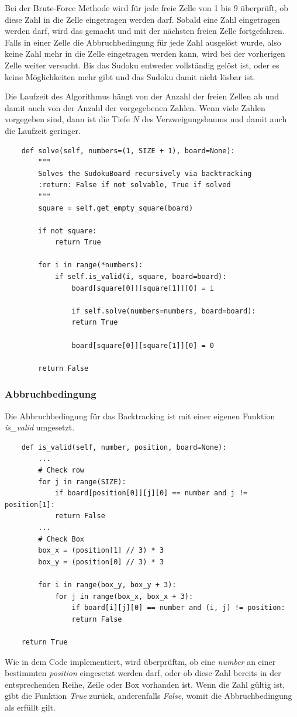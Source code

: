 Bei der Brute-Force Methode wird für jede freie Zelle von 1 bis 9 überprüft, ob diese Zahl in die Zelle eingetragen werden darf. Sobald eine Zahl eingetragen werden darf, wird das gemacht und mit der nächsten freien Zelle fortgefahren. Falls in einer Zelle die Abbruchbedingung für jede Zahl ausgelöst wurde, also keine Zahl mehr in die Zelle eingetragen werden kann, wird bei der vorherigen Zelle weiter versucht. Bis das Sudoku entweder vollständig gelöst ist, oder es keine Möglichkeiten mehr gibt und das Sudoku damit nicht lösbar ist.

Die Laufzeit des Algorithmus hängt von der Anzahl der freien Zellen ab und damit auch von der Anzahl der vorgegebenen Zahlen. Wenn viele Zahlen vorgegeben sind, dann ist die Tiefe $N$ des Verzweigungsbaums und damit auch die Laufzeit geringer. 

\begin{lstlisting}
	def solve(self, numbers=(1, SIZE + 1), board=None):
		"""
		Solves the SudokuBoard recursively via backtracking
		:return: False if not solvable, True if solved
		"""
		square = self.get_empty_square(board)
		
		if not square:
			return True
		
		for i in range(*numbers):
			if self.is_valid(i, square, board=board):
				board[square[0]][square[1]][0] = i
		
				if self.solve(numbers=numbers, board=board):
				return True
		
				board[square[0]][square[1]][0] = 0
		
		return False
\end{lstlisting}

\subsubsection{Abbruchbedingung}
Die Abbruchbedingung für das Backtracking ist mit einer eigenen Funktion \textit{is\_valid} umgesetzt.
\begin{lstlisting}
	def is_valid(self, number, position, board=None):
		...
		# Check row
		for j in range(SIZE):
			if board[position[0]][j][0] == number and j != position[1]:
			return False
		...
		# Check Box
		box_x = (position[1] // 3) * 3
		box_y = (position[0] // 3) * 3
		
		for i in range(box_y, box_y + 3):
			for j in range(box_x, box_x + 3):
				if board[i][j][0] == number and (i, j) != position:
				return False
		
	return True
\end{lstlisting}
Wie in dem Code implementiert, wird überprüftm, ob eine \textit{number} an einer bestimmten \textit{position} eingesetzt werden darf, oder ob diese Zahl bereits in der entsprechenden Reihe, Zeile oder Box vorhanden ist. Wenn die Zahl gültig ist, gibt die Funktion \textit{True} zurück, anderenfalls \textit{False}, womit die Abbruchbedingung als erfüllt gilt. \cite{knott_2017} 

